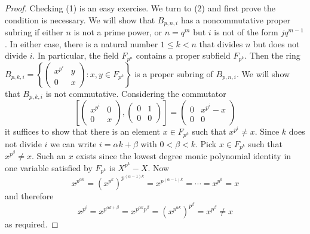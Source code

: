 \documentclass[10pt,a4paper]{amsart}
\begin{document}
\begin{proof}
Checking (1) is an easy exercise. We turn to (2) and first prove the condition is necessary. We will show that $B_{p,n,i}$ has a noncommutative proper subring if either $n$ is not a prime power, or $n=q^m$ but $i$ is not of the form $jq^{m-1}$. In either case, there is a natural number $1\leq k<n$ that divides $n$ but does not divide $i$. In particular, the field $F_{p^n}$ contains a proper subfield $F_{p^k}$. Then the ring $B_{p,k,i}=\left\lbrace\begin{pmatrix}
x^{p^i}&y\\
0&x
\end{pmatrix}
:x,y\in F_{p^k}\right\rbrace$ is a proper subring of $B_{p,n,i}$. We will show that $B_{p,k,i}$ is not commutative. Considering the commutator
\[\left[\begin{pmatrix}
x^{p^i}&0\\
0&x
\end{pmatrix},\begin{pmatrix}
0&1\\
0&0
\end{pmatrix}\right]=\begin{pmatrix}
0&x^{p^i}-x\\
0&0
\end{pmatrix}\]
it suffices to show that there is an element $x\in F_{p^k}$ such that $x^{p^i}\neq x$. Since $k$ does not divide $i$ we can write $i=\alpha k+\beta$ with $0<\beta<k$. Pick $x\in F_{p^k}$ such that $x^{p^\beta}\neq x$. Such an $x$ exists since the lowest degree monic polynomial identity in one variable satisfied by $F_{p^k}$ is $X^{p^k}-X$. Now
\[x^{p^{\alpha k}}=\left(x^{p^k}\right)^{p^{(\alpha-1)k}}=x^{p^{(\alpha-1)k}}=\cdots=x^{p^k}=x\]
and therefore
\[x^{p^i}=x^{p^{\alpha k+\beta}}=x^{p^{\alpha k}p^\beta}=\left(x^{p^{\alpha k}}\right)^{p^\beta}=x^{p^\beta}\neq x\]
as required.


\end{proof}
\end{document}
